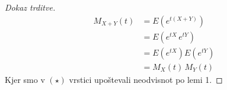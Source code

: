 \documentclass[12pt]{book}
\theoremstyle{definition}
\theoremstyle{plain}
\theoremstyle{plain}
\theoremstyle{plain}
\theoremstyle{plain}
\theoremstyle{remark}
\begin{document}
\begin{proof}[Dokaz trditve]
    \begin{align*}
        M_{X+Y}(t)&=E\left(e^{t (X+Y)}\right) \\
        &=E\left(e^{t X} \, e^{t  Y}\right) \tag{$\star$} \\
        &=E\left(e^{t X}\right) E\left(e^{tY}\right) \\
        &=M_X(t) \, M_Y(t)
    \end{align*}
    Kjer smo v $(\star)$ vrstici upoštevali neodvisnot po lemi 1.
\end{proof}
\end{document}
